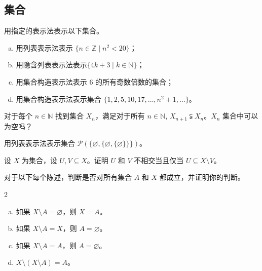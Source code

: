 \subsection*{集合}

\begin{chapex}
用指定的表示法表示以下集合。
\begin{enumerate}[(a)]
\item 用列表表示法表示 $\{ n \in \mathbb{Z} \mid n^2 < 20 \}$；
\item 用隐含列表表示法表示$\{ 4k+3 \mid k \in \mathbb{N} \}$；
\item 用集合构造表示法表示 6 的所有奇数倍数的集合；
\item 用集合构造表示法表示集合 $\{ 1, 2, 5, 10, 17, \dots, n^2+1, \dots \}$。
\end{enumerate}
\end{chapex}

\begin{chapex}
对于每个 $n \in \mathbb{N}$ 找到集合 $X_n$，满足对于所有 $n \in \mathbb{N}$, $X_{n+1} \subsetneqq X_n$。$X_n$ 集合中可以为空吗？
\end{chapex}

\begin{chapex}
用列表表示法表示集合 $\mathcal{P}(\{ \varnothing, \{ \varnothing, \{ \varnothing \} \} \})$。
\end{chapex}

\begin{chapex}
设 $X$ 为集合，设 $U,V\subseteq X$。证明 $U$ 和 $V$ 不相交当且仅当 $U \subseteq X \setminus V$。
\end{chapex}

\begin{chapex}
对于以下每个陈述，判断是否对所有集合 $A$ 和 $X$ 都成立，并证明你的判断。
\begin{multicols}{2}
\begin{enumerate}[(a)]
\item 如果 $X \setminus A = \varnothing$，则 $X = A$。
\item 如果 $X \setminus A = X$，则 $A = \varnothing$。
\item 如果 $X \setminus A = A$，则 $A = \varnothing$。
\item $X \setminus (X \setminus A) = A$。
\end{enumerate}
\end{multicols}
\end{chapex}

